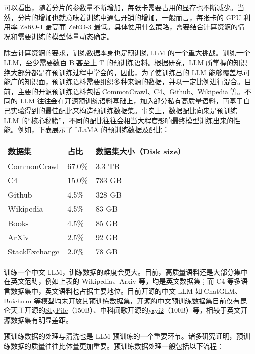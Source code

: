 \documentclass[12pt,a4paper]{book}
\begin{document}
可以看出，随着分片的参数量不断增加，每张卡需要占用的显存也不断减少。当然，分片的增加也就意味着训练中通信开销的增加，一般而言，每张卡的
GPU 利用率 ZeRO-1 最高而 ZeRO-3
最低。具体使用什么策略，需要结合计算资源的情况和需要训练的模型体量动态确定。

除去计算资源的要求，训练数据本身也是预训练 LLM 的一个重大挑战。训练一个
LLM，至少需要数百 B 甚至上 T 的预训练语料。根据研究，LLM
所掌握的知识绝大部分都是在预训练过程中学会的，因此，为了使训练出的 LLM
能够覆盖尽可能广的知识面，预训练语料需要组织多种来源的数据，并以一定比例进行混合。目前，主要的开源预训练语料包括
CommonCrawl、C4、Github、Wikipedia 等。不同的 LLM
往往会在开源预训练语料基础上，加入部分私有高质量语料，再基于自己实验得到的最佳配比来构造预训练数据集。事实上，数据配比向来是预训练
LLM
的``核心秘籍''，不同的配比往往会相当大程度影响最终模型训练出来的性能。例如，下表展示了
LLaMA 的预训练数据及配比：

\begin{longtable}[]{@{}lll@{}}
\toprule\noalign{}
数据集 & 占比 & 数据集大小（Disk size） \\
\midrule\noalign{}
\endhead
\bottomrule\noalign{}
\endlastfoot
CommonCrawl & 67.0\% & 3.3 TB \\
C4 & 15.0\% & 783 GB \\
Github & 4.5\% & 328 GB \\
Wikipedia & 4.5\% & 83 GB \\
Books & 4.5\% & 85 GB \\
ArXiv & 2.5\% & 92 GB \\
StackExchange & 2.0\% & 78 GB \\
\end{longtable}

训练一个中文
LLM，训练数据的难度会更大。目前，高质量语料还是大部分集中在英文范畴，例如上表的
Wikipedia、Arxiv 等，均是英文数据集；而 C4
等多语言数据集中，英文语料也占据主要地位。目前开源的中文 LLM 如
ChatGLM、Baichuan
等模型均未开放其预训练数据集，开源的中文预训练数据集目前仅有昆仑天工开源的\href{https://huggingface.co/datasets/Skywork/SkyPile-150B}{SkyPile}（150B）、中科闻歌开源的\href{https://huggingface.co/datasets/wenge-research/yayi2_pretrain_data}{yayi2}（100B）等，相较于英文开源数据集有明显差距。

预训练数据的处理与清洗也是 LLM
预训练的一个重要环节。诸多研究证明，预训练数据的质量往往比体量更加重要。预训练数据处理一般包括以下流程：
\end{document}
